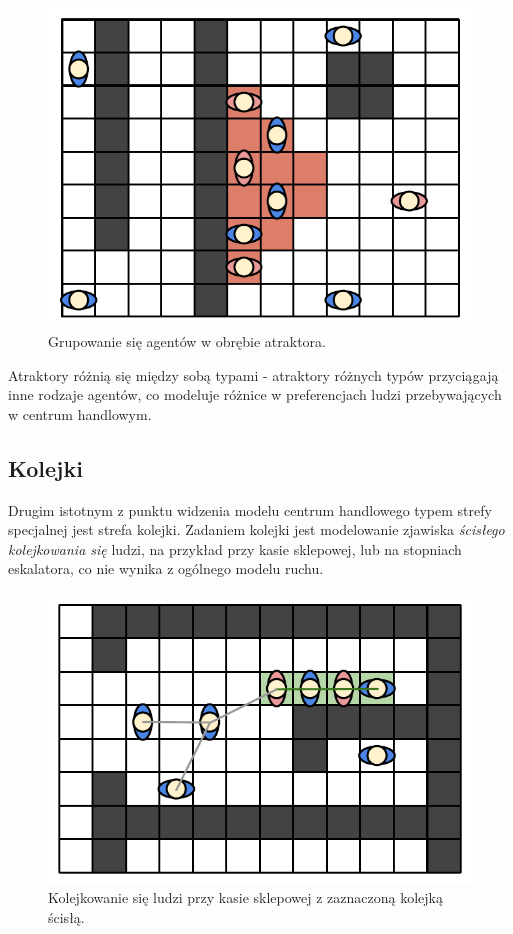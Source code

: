 \documentclass[a4paper, 12pt]{article}
\begin{document}
    \begin{figure}[H]
        \centering
        \includegraphics[scale=0.4]{./img/Crowding.pdf}
        \caption{Grupowanie się agentów w obrębie atraktora.}
        \label{fig:crowding}
    \end{figure}

Atraktory różnią się między sobą typami - atraktory różnych typów przyciągają inne rodzaje agentów, co modeluje różnice w preferencjach ludzi przebywających w centrum handlowym.

    \subsection{Kolejki}
    \label{sec:queues}

Drugim istotnym z punktu widzenia modelu centrum handlowego typem strefy specjalnej jest strefa kolejki. Zadaniem kolejki jest modelowanie zjawiska \emph{ścisłego kolejkowania się} ludzi, na przykład przy kasie sklepowej, lub na stopniach eskalatora, co nie wynika z ogólnego modelu ruchu.

    \begin{figure}[H]
        \centering
        \includegraphics[scale=0.4]{./img/Queueing.pdf}
        \caption{Kolejkowanie się ludzi przy kasie sklepowej z zaznaczoną kolejką ścisłą.}
        \label{fig:queueing}
    \end{figure}
\end{document}
